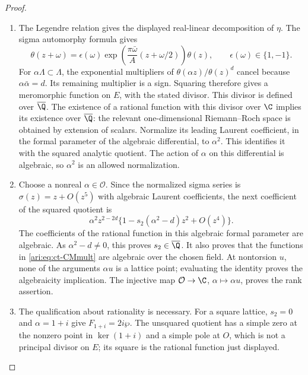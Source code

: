 \begin{proof}
\begin{enumerate}[label=\arabic*.,leftmargin=*]
\item The Legendre relation gives the displayed real-linear decomposition
of $\eta$. The sigma automorphy formula gives
\[
 \theta(z+\omega)=\epsilon(\omega)
  \exp\left(\frac{\pi\bar\omega}{A}
                         (z+\omega/2)\right)\theta(z),
 \qquad \epsilon(\omega)\in\{1,-1\}.
\]
For $\alpha\Lambda\subset\Lambda$, the exponential multipliers
of $\theta(\alpha z)/\theta(z)^d$ cancel because
$\alpha\bar\alpha=d$. Its remaining multiplier is a sign.
Squaring therefore gives a meromorphic function on $E$, with the
stated divisor. This divisor is defined over $\overline{\Q}$.
The existence of a rational function with this divisor over $\C$
implies its existence over $\overline{\Q}$: the relevant
one-dimensional Riemann--Roch space is obtained by extension of
scalars. Normalize its leading Laurent coefficient, in the formal
parameter of the algebraic differential, to $\alpha^2$. This
identifies it with the squared analytic quotient. The action of
$\alpha$ on this differential is algebraic, so $\alpha^2$ is an
allowed normalization.

\item Choose a nonreal $\alpha\in\mathcal O$. Since the normalized
sigma series is $\sigma(z)=z+O(z^5)$ with algebraic Laurent
coefficients, the next coefficient of the squared quotient is
\[
 \alpha^2z^{2-2d}
       \{1-s_2(\alpha^2-d)z^2+O(z^4)\}.
\]
The coefficients of the rational function in this algebraic formal
parameter are algebraic. As $\alpha^2-d\ne0$, this proves
$s_2\in\overline{\Q}$. It also proves that the functions in
\eqref{ari:eq:ct-CMmult} are algebraic over the chosen field.
At nontorsion $u$, none of the arguments $\alpha u$ is a lattice
point; evaluating the identity proves the algebraicity implication.
The injective map $\mathcal O\to\C$, $\alpha\mapsto\alpha u$,
proves the rank assertion.

\item The qualification about rationality is necessary. For a square
lattice, $s_2=0$ and $\alpha=1+i$ give
$F_{1+i}=2i\wp$. The unsquared quotient has a simple zero at
the nonzero point in $\ker(1+i)$ and a simple pole at $O$,
which is not a principal divisor on $E$; its square is the
rational function just displayed.
\end{enumerate}
\end{proof}

